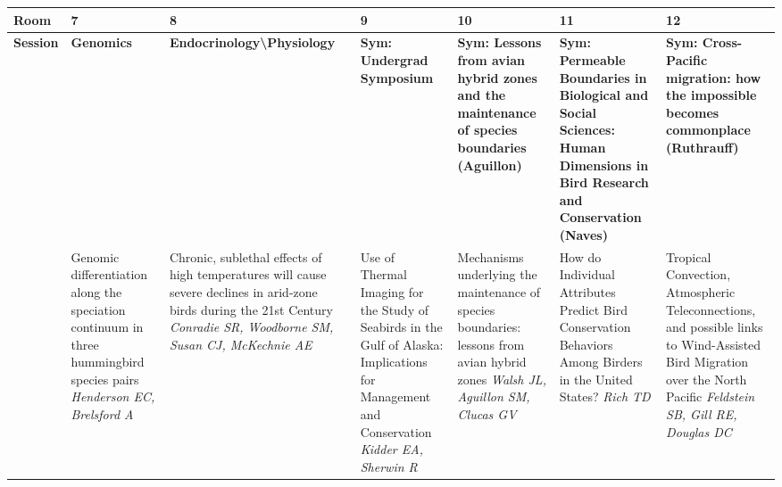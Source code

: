 \begin{tabular}{|x{0.75cm}|x{2.25cm}|x{2.25cm}|a{2.25cm}|a{2.25cm}|a{2.25cm}|a{2.25cm}|}\hline
Room & 7 & 8 & 9 & 10 & 11 & 12\\
\hline
\rule{0pt}{1em} \textbf{Session} &\footnotesize \textbf{Genomics} & \footnotesize \textbf{Endocrinology\textbackslash Physiology} & \footnotesize \textbf{Sym: Undergrad Symposium} & \footnotesize \textbf{Sym: Lessons from avian hybrid zones and the maintenance of species boundaries (Aguillon)} & \footnotesize \textbf{Sym: Permeable Boundaries in Biological and Social Sciences: Human Dimensions in Bird Research and Conservation (Naves)} & \footnotesize \textbf{Sym: Cross-Pacific migration: how the impossible becomes commonplace (Ruthrauff)}\\
\hline
{}&Genomic differentiation along the speciation continuum in three hummingbird species pairs \newline \newline \textit{Henderson EC, Brelsford A} & Chronic, sublethal effects of high temperatures will cause severe declines in arid-zone birds during the 21st Century \newline \newline \textit{Conradie SR, Woodborne SM, Susan CJ, McKechnie AE} & Use of Thermal Imaging for the Study of Seabirds in the Gulf of Alaska: Implications for Management and Conservation \newline \newline \textit{Kidder EA, Sherwin R} & Mechanisms underlying the maintenance of species boundaries: lessons from avian hybrid zones \newline \newline \textit{Walsh JL, Aguillon SM, Clucas GV} & How do Individual Attributes Predict Bird Conservation Behaviors Among Birders in the United States? \newline \newline \textit{Rich TD} & Tropical Convection, Atmospheric Teleconnections, and possible links to Wind-Assisted Bird Migration over the North Pacific \newline \newline \textit{Feldstein SB, Gill RE, Douglas DC}\\
\hline

\end{tabular}
